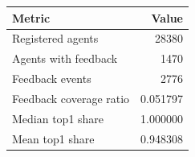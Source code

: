 \begin{tabular}{lr}\hline
Metric & Value \\ \hline
Registered agents & 28380 \\ 
Agents with feedback & 1470 \\ 
Feedback events & 2776 \\ 
Feedback coverage ratio & 0.051797 \\ 
Median top1 share & 1.000000 \\ 
Mean top1 share & 0.948308 \\ 
\hline\end{tabular}
